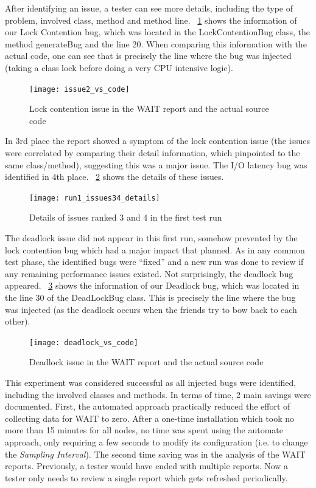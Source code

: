 \documentclass[runningheads,a4paper]{llncs}
\begin{document}
After identifying an issue, a tester can see more details, including the type of
problem, involved class, method and method line. \figurename
~\ref{fig_issue2_vs_code} shows the information of our Lock Contention bug,
which was located in the LockContentionBug class, the method generateBug and the
line 20. When comparing this information with the actual code, one can see that
is precisely the line where the bug was injected (taking a class lock before
doing a very CPU intensive logic).
\vspace{-5pt}
\begin{figure}[!h]
\texttt{[image: issue2\_vs\_code]}
\caption{Lock contention issue in the WAIT report and the actual source code}
\label{fig_issue2_vs_code}
\end{figure}
\vspace{-5pt}
In 3rd place the report showed a symptom of the lock contention issue
(the issues were correlated by comparing their detail information, which
pinpointed to the same class/method), suggesting this was a major issue. The I/O
latency bug was identified in 4th place. \figurename ~\ref{fig_issues34} shows
the details of these issues.
\vspace{-5pt}
\begin{figure}[!h]
\texttt{[image: run1\_issues34\_details]}
\caption{Details of issues ranked 3 and 4 in the first test run}
\label{fig_issues34}
\end{figure}
\vspace{-5pt}
The deadlock issue did not appear in this first run, somehow prevented by the
lock contention bug which had a major impact that planned. As in any common
test phase, the identified bugs were ``fixed'' and a new run was done to review
if any remaining performance issues existed. Not surprisingly, the deadlock bug
appeared. \figurename ~\ref{fig_dlissue_vs_code} shows the information of our
Deadlock bug, which was located in the line 30 of the DeadLockBug class. This is
precisely the line where the bug was injected (as the deadlock occurs when the
friends try to bow back to each other).
\vspace{-5pt}
\begin{figure}[!h]
\texttt{[image: deadlock\_vs\_code]}
\caption{Deadlock issue in the WAIT report and the
actual source code}
\label{fig_dlissue_vs_code}
\end{figure}
\vspace{-5pt}
This experiment was considered successful as all injected bugs were identified,
including the involved classes and methods. In terms of time, 2 main savings
were documented. First, the automated approach practically reduced the effort of
collecting data for WAIT to zero. After a one-time installation which took no
more than 15 minutes for all nodes, no time was spent using the automate
approach, only requiring a few seconds to modify its  configuration (i.e. to
change the \emph{Sampling Interval}). The second time saving was in the analysis
of the WAIT reports. Previously, a tester would have ended with multiple
reports. Now a tester only needs to review a single report which gets refreshed
periodically.
\end{document}
